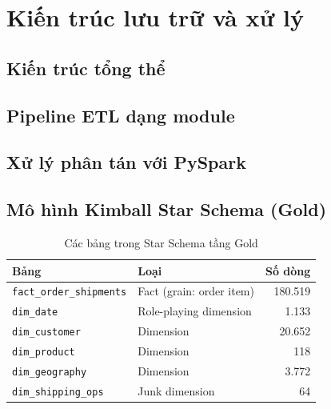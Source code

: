 \chapter{Kiến trúc lưu trữ và xử lý}
\label{chap:architecture}

\section{Kiến trúc tổng thể}

\section{Pipeline ETL dạng module}

\section{Xử lý phân tán với PySpark}

\section{Mô hình Kimball Star Schema (Gold)}
\begin{table}[H]
\centering
\caption{Các bảng trong Star Schema tầng Gold}
\label{tab:star}
\begin{tabular}{llr}
\toprule
\textbf{Bảng} & \textbf{Loại} & \textbf{Số dòng} \\ \midrule
\texttt{fact\_order\_shipments} & Fact (grain: order item) & 180.519 \\
\texttt{dim\_date}         & Role-playing dimension & 1.133 \\
\texttt{dim\_customer}     & Dimension & 20.652 \\
\texttt{dim\_product}      & Dimension & 118 \\
\texttt{dim\_geography}    & Dimension & 3.772 \\
\texttt{dim\_shipping\_ops} & Junk dimension & 64 \\
\bottomrule
\end{tabular}
\end{table}

